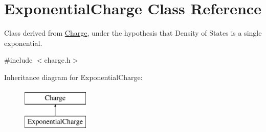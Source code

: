 \hypertarget{classExponentialCharge}{\section{Exponential\-Charge Class Reference}
\label{classExponentialCharge}
}


Class derived from \hyperlink{classCharge}{Charge}, under the hypothesis that Density of States is a single exponential.  




{\ttfamily \#include $<$charge.\-h$>$}

Inheritance diagram for Exponential\-Charge\-:\begin{figure}[H]
\begin{center}
\leavevmode
\includegraphics[height=2.000000cm]{classExponentialCharge}
\end{center}
\end{figure}

